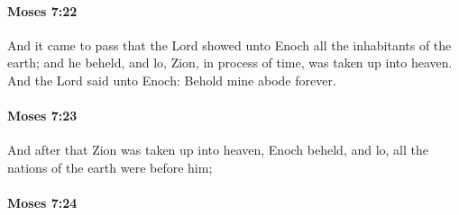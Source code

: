 
		\paragraph{Moses 7:22} %
			\label{MOSES-7-22}

			And it came to pass that the Lord showed unto Enoch all the inhabitants of the earth; and he beheld, and lo, Zion, in process of time, was taken up into heaven. And the Lord said unto Enoch: Behold mine abode forever.


		\paragraph{Moses 7:23} %
			\label{MOSES-7-23}

			And after that Zion was taken up into heaven, Enoch beheld, and lo, all the nations of the earth were before him;


		\paragraph{Moses 7:24} %
			\label{MOSES-7-24}

